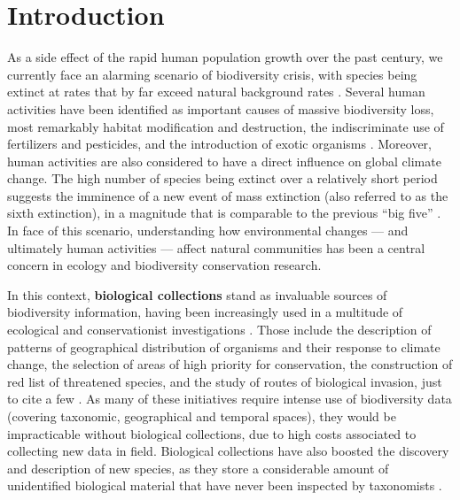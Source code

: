 \chapter{Introduction}\label{introduction}

As a side effect of the rapid human population growth over the past century, we currently face an alarming scenario of biodiversity crisis, with species being extinct at rates that by far exceed natural background rates \cite{Ceballos2015}.
Several human activities have been identified as important causes of massive biodiversity loss, most remarkably habitat modification and destruction, the indiscriminate use of fertilizers and pesticides, and the introduction of exotic organisms \cite{Wilcove1998}.
Moreover, human activities are also considered to have a direct influence on global climate change.
The high number of species being extinct over a relatively short period suggests the imminence of a new event of mass extinction (also referred to as the sixth extinction), in a magnitude that is comparable to the previous ``big five'' \cite{Wake2008}.
In face of this scenario, understanding how environmental changes --- and ultimately human activities --- affect natural communities has been a central concern in ecology and biodiversity conservation research.





In this context, \textbf{biological collections} stand as invaluable sources of biodiversity information, having been increasingly used in a multitude of ecological and conservationist investigations \cite{Pyke2010}.
Those include the description of patterns of geographical distribution of organisms and their response to climate change, the selection of areas of high priority for conservation, the construction of red list of threatened species, and the study of routes of biological invasion, just to cite a few \cite{Nualart2017,Kemp2015,Chapman2005b}. %
As many of these initiatives require intense use of biodiversity data (covering taxonomic, geographical and temporal spaces), they would be impracticable without biological collections, due to high costs associated to collecting new data in field.
Biological collections have also boosted the discovery and description of new species, as they store a considerable amount of unidentified biological material that have never been inspected by taxonomists \cite{Kemp2015}.


